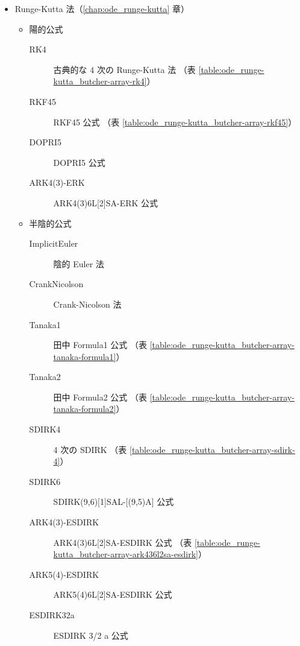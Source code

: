 \begin{itemize}
    \item Runge-Kutta 法（\ref{chap:ode_runge-kutta} 章）
          \begin{itemize}
              \item 陽的公式
                    \begin{description}
                        \item[RK4] 古典的な 4 次の Runge-Kutta 法 \cite{Mitsui1993}
                              （表 \ref{table:ode_runge-kutta_butcher-array-rk4}）
                        \item[RKF45] RKF45 公式 \cite{Mitsui1993}
                              （表 \ref{table:ode_runge-kutta_butcher-array-rkf45}）
                        \item[DOPRI5] DOPRI5 公式 \cite{Hairer1991}
                        \item[ARK4(3)-ERK] ARK4(3)6L[2]SA-ERK 公式 \cite{Kennedy2003}
                    \end{description}
              \item 半陰的公式
                    \begin{description}
                        \item[ImplicitEuler] 陰的 Euler 法
                        \item[CrankNicolson] Crank-Nicolson 法
                        \item[Tanaka1] 田中 Formula1 公式 \cite{Togawa2007}
                              （表 \ref{table:ode_runge-kutta_butcher-array-tanaka-formula1}）
                        \item[Tanaka2] 田中 Formula2 公式 \cite{Togawa2007}
                              （表 \ref{table:ode_runge-kutta_butcher-array-tanaka-formula2}）
                        \item[SDIRK4] 4 次の SDIRK \cite[Section IV.6.]{Hairer1991}
                              （表 \ref{table:ode_runge-kutta_butcher-array-sdirk-4}）
                        \item[SDIRK6] SDIRK(9,6)[1]SAL-[(9,5)A] 公式 \cite{Alamri2023}
                        \item[ARK4(3)-ESDIRK] ARK4(3)6L[2]SA-ESDIRK 公式 \cite{Kennedy2003}
                              （表 \ref{table:ode_runge-kutta_butcher-array-ark436l2sa-esdirk}）
                        \item[ARK5(4)-ESDIRK] ARK5(4)6L[2]SA-ESDIRK 公式 \cite{Kennedy2003}
                        \item[ESDIRK32a] ESDIRK 3/2 a 公式 \cite{Kvaerno2004}

\end{description}
\end{itemize}
\end{itemize}
